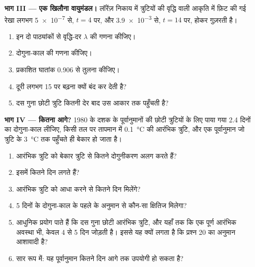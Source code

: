 \begin{problem}[{सप्ताहांत समस्या --- कितना आगे?}]
\medskip\noindent\textbf{भाग III --- एक खिलौना वायुमंडल।}
लॉरेंज़ निकाय में त्रुटियों की वृद्धि वाली आकृति में फ़िट की गई रेखा
लगभग \num{5e-7} से, $t = 4$ पर, और \num{3.9e-3} से, $t = 14$ पर, होकर गुज़रती है।
\begin{enumerate}[resume]
  \item इन दो पाठ्यांकों से वृद्धि-दर $\lambda$ की गणना कीजिए।
  \item दोगुना-काल की गणना कीजिए।
  \item प्रकाशित घातांक 0.906 से तुलना कीजिए।
  \item दूरी लगभग 15 पर बढ़ना क्यों बंद कर देती है?
  \item दस गुना छोटी त्रुटि कितनी देर बाद उस आकार तक पहुँचती है?
\end{enumerate}

\medskip\noindent\textbf{भाग IV --- कितना आगे?}
1980 के दशक के पूर्वानुमानों की छोटी त्रुटियों के लिए पाया गया 2.4 दिनों का दोगुना-काल लीजिए, किसी तल पर
तापमान में \qty{0.1}{\celsius} की आरंभिक त्रुटि, और एक पूर्वानुमान जो
त्रुटि के \qty{3}{\celsius} तक पहुँचते ही बेकार हो जाता है।
\begin{enumerate}[resume]
  \item आरंभिक त्रुटि को बेकार त्रुटि से कितने दोगुनीकरण अलग करते हैं?
  \item इसमें कितने दिन लगते हैं?
  \item आरंभिक त्रुटि को आधा करने से कितने दिन मिलेंगे?
  \item 5 दिनों के दोगुना-काल के पहले के अनुमान से कौन-सा क्षितिज मिलेगा?
  \item आधुनिक प्रयोग पाते हैं कि दस गुना छोटी आरंभिक त्रुटि, और यहाँ तक कि एक पूर्ण
        आरंभिक अवस्था भी, केवल 4 से 5 दिन जोड़ती है। इससे यह क्यों लगता है कि
        प्रश्न 20 का अनुमान आशावादी है?
  \item सार रूप में: यह पूर्वानुमान कितने दिन आगे तक उपयोगी हो सकता है?
\end{enumerate}
\end{problem}
